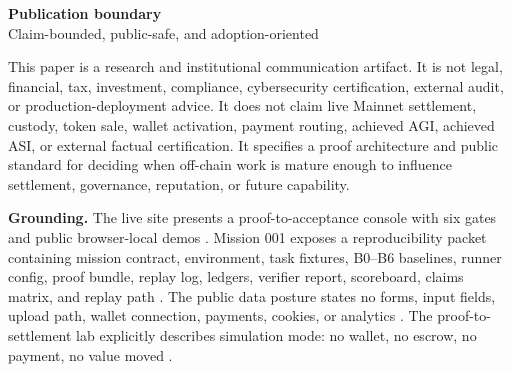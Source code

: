 \newpage
\begin{center}
{\Huge\bfseries\sffamily\color{NavyInk} Publication boundary}\\[0.08in]
{\large\sffamily\color{MutedText} Claim-bounded, public-safe, and adoption-oriented}
\end{center}
\Rule
\begin{boundarybox}
This paper is a research and institutional communication artifact. It is not legal, financial, tax, investment, compliance, cybersecurity certification, external audit, or production-deployment advice. It does not claim live Mainnet settlement, custody, token sale, wallet activation, payment routing, achieved AGI, achieved ASI, or external factual certification. It specifies a proof architecture and public standard for deciding when off-chain work is mature enough to influence settlement, governance, reputation, or future capability.
\end{boundarybox}

\begin{evidencebox}
\textbf{Grounding.} The live \Signoff{} site presents a proof-to-acceptance console with six gates and public browser-local demos \citep{goalosSignoffSite}. Mission 001 exposes a reproducibility packet containing mission contract, environment, task fixtures, B0--B6 baselines, runner config, proof bundle, replay log, ledgers, verifier report, scoreboard, claims matrix, and replay path \citep{goalosMission001}. The public data posture states no forms, input fields, upload path, wallet connection, payments, cookies, or analytics \citep{goalosNoData}. The proof-to-settlement lab explicitly describes simulation mode: no wallet, no escrow, no payment, no value moved \citep{goalosSettlementLab}.
\end{evidencebox}

